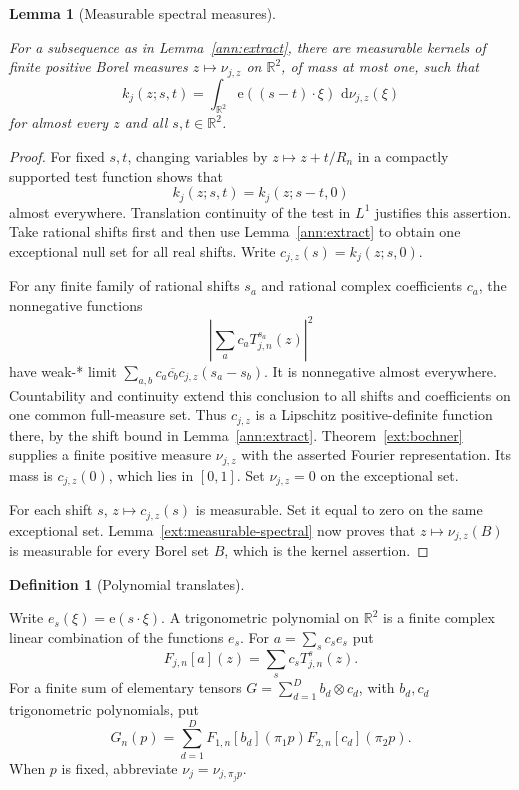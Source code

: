 \documentclass[11pt]{amsart}
\newcommand{\R}{\mathbb R}
\newcommand{\dd}{\,\mathrm d}
\newcommand{\e}{\mathrm e}
\newtheorem{lemma}[theorem]{Lemma}
\theoremstyle{definition}
\newtheorem{definition}[theorem]{Definition}
\theoremstyle{remark}
\numberwithin{equation}{section}
\providecommand{\lean}[1]{}
\providecommand{\leanok}{}
\begin{document}
\begin{lemma}[Measurable spectral measures]\label{ann:spectral}
\lean{Auto.ann_spectral}
\leanok
For a subsequence as in Lemma~\ref{ann:extract}, there are measurable
kernels of finite positive Borel measures $z\mapsto\nu_{j,z}$ on
$\R^2$, of mass at most one, such that
\[
 k_j(z;s,t)=\int_{\R^2}\e((s-t)\cdot\xi)\,\dd\nu_{j,z}(\xi)
\]
for almost every $z$ and all $s,t\in\R^2$.
\end{lemma}
\begin{proof}
For fixed $s,t$, changing variables by $z\mapsto z+t/R_n$ in a
compactly supported test function shows that
\[
 k_j(z;s,t)=k_j(z;s-t,0)
\]
almost everywhere. Translation continuity of the test in $L^1$
justifies this assertion. Take rational shifts first and then use
Lemma~\ref{ann:extract} to obtain one exceptional null set for all
real shifts. Write $c_{j,z}(s)=k_j(z;s,0)$.

For any finite family of rational shifts $s_a$ and rational complex
coefficients $c_a$, the nonnegative functions
\[
 \left|\sum_a c_aT^{s_a}_{j,n}(z)\right|^2
\]
have weak-* limit
$\sum_{a,b}c_a\overline{c_b}c_{j,z}(s_a-s_b)$. It is nonnegative
almost everywhere. Countability and continuity extend this conclusion
to all shifts and coefficients on one common full-measure set.
Thus $c_{j,z}$ is a Lipschitz positive-definite function there,
by the shift bound in Lemma~\ref{ann:extract}.
Theorem~\ref{ext:bochner} supplies a finite positive measure $\nu_{j,z}$
with the asserted Fourier representation. Its mass is
$c_{j,z}(0)$, which lies in $[0,1]$. Set $\nu_{j,z}=0$ on the
exceptional set.

For each shift $s$, $z\mapsto c_{j,z}(s)$ is measurable.
Set it equal to zero on the same exceptional set.
Lemma~\ref{ext:measurable-spectral} now proves that
$z\mapsto\nu_{j,z}(B)$ is measurable for every Borel set $B$,
which is the kernel assertion.
\end{proof}

\begin{definition}[Polynomial translates]\label{ann:polynomials}
\lean{Auto.charE,Auto.trigPoly,Auto.tensorPoly,Auto.polyTranslate,Auto.tensorTranslate}
Write $e_s(\xi)=\e(s\cdot\xi)$. A trigonometric polynomial on
$\R^2$ is a finite complex linear combination of the functions $e_s$.
For $a=\sum_s c_se_s$ put
\[
 F_{j,n}[a](z)=\sum_s c_s T^s_{j,n}(z).
\]
For a finite sum of elementary tensors
$G=\sum_{d=1}^D b_d\otimes c_d$, with $b_d,c_d$ trigonometric
polynomials, put
\[
 G_n(p)=\sum_{d=1}^D
 F_{1,n}[b_d](\pi_1p)F_{2,n}[c_d](\pi_2p).
\]
When $p$ is fixed, abbreviate $\nu_j=\nu_{j,\pi_jp}$.
\end{definition}
\end{document}
